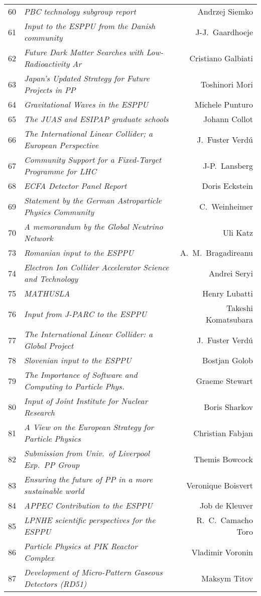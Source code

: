 \begin{flushleft}
\begin{tabular}{llr}
60 & \it PBC technology subgroup report & Andrzej Siemko \\
61 & \it Input to the ESPPU from the Danish community & J-J.\ Gaardhoeje \\
62 & \it Future Dark Matter Searches with Low-Radioactivity Ar & Cristiano Galbiati \\
63 & \it Japan's Updated Strategy for Future Projects in PP & Toshinori Mori \\
64 & \it Gravitational Waves in the ESPPU & Michele Punturo \\
65 & \it The JUAS and ESIPAP graduate schools & Johann Collot \\
66 & \it The International Linear Collider; a European Perspective & J.\ Fuster Verd\'{u} \\
67 & \it Community Support for a Fixed-Target Programme for LHC & J-P.\ Lansberg \\
68 & \it ECFA Detector Panel Report & Doris Eckstein \\
69 & \it Statement by the German Astroparticle Physics Community &	C.\ Weinheimer \\
70 & \it A memorandum by the Global Neutrino Network & Uli Katz \\
73 & \it Romanian input to the ESPPU & A.\ M.\ Bragadireanu \\
74 & \it Electron Ion Collider Accelerator Science and Technology & Andrei Seryi \\
75 & \it MATHUSLA & Henry Lubatti \\
76 & \it Input from J-PARC to the ESPPU & Takeshi Komatsubara \\
77 & \it The International Linear Collider: a Global Project & J.\ Fuster Verd\'{u} \\
78 & \it Slovenian input to the ESPPU & Bostjan Golob \\
79 & \it The Importance of Software and Computing to Particle Phys. & Graeme Stewart \\
80 & \it Input of Joint Institute for Nuclear Research & Boris Sharkov \\
81 & \it A View on the European Strategy for Particle Physics & Christian Fabjan \\
82 & \it Submission from Univ.\ of Liverpool Exp.\ PP Group & Themis Bowcock \\
83 & \it Ensuring the future of PP in a more sustainable world & Veronique Boisvert \\
84 & \it APPEC Contribution to the ESPPU & Job de Kleuver \\
85 & \it LPNHE scientific perspectives for the ESPPU & R.\ C.\ Camacho Toro \\
86 & \it Particle Physics at PIK Reactor Complex & Vladimir Voronin \\
87 & \it Development of Micro-Pattern Gaseous Detectors (RD51) & Maksym Titov \\
\end{tabular}
\end{flushleft}
